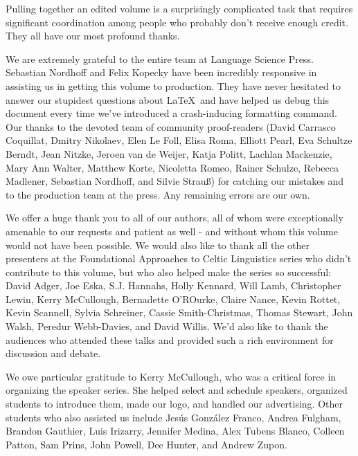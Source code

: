 \addchap{\lsAcknowledgementTitle} 

Pulling together an edited volume is a surprisingly complicated task that requires significant coordination among people who probably don't receive enough credit. They all have our most profound thanks.

We are extremely grateful to the entire team at Language Science Press. Sebastian Nordhoff and Felix Kopecky have been incredibly responsive in assisting us in getting this volume to production. They have never hesitated to answer our stupidest questions about \LaTeX\ and have helped us debug this document every time we've introduced a crash-inducing formatting command. Our thanks to the devoted team of community proof-readers (David Carrasco Coquillat, Dmitry Nikolaev, Elen Le Foll, Elisa Roma, Elliott Pearl, Eva Schultze Berndt, Jean Nitzke, Jeroen van de Weijer, Katja Politt, Lachlan Mackenzie, Mary Ann Walter, Matthew Korte, Nicoletta Romeo, Rainer Schulze, Rebecca Madlener, Sebastian Nordhoff, and Silvie Strauß) for catching our mistakes and to the production team at the press. Any remaining errors are our own. 


We offer a huge thank you to all of our authors, all of whom were exceptionally amenable to our requests and patient as well - and without whom this volume would not have been possible. We would also like to thank all the other presenters at the Foundational Approaches to Celtic Linguistics series who didn't contribute to this volume, but who also helped make the series so successful: David Adger, Joe Eska, S.J. Hannahs, Holly Kennard, Will Lamb, Christopher Lewin, Kerry McCullough, Bernadette O'ROurke, Claire Nance, Kevin Rottet, Kevin Scannell, Sylvia Schreiner, Cassie Smith-Christmas, Thomas Stewart, John Walsh, Peredur Webb-Davies, and David Willis. We'd also like to thank the audiences who attended these talks and provided such a rich environment for discussion and debate.

We owe particular gratitude to Kerry McCullough, who was a critical force in organizing the speaker series. She helped select and schedule speakers, organized students to introduce them, made our logo, and handled our advertising. Other students who also assisted us include Jes\'us Gonz\'alez Franco, Andrea Fulgham, Brandon Gauthier, Luis Irizarry, Jennifer Medina, Alex Tubens Blanco, Colleen Patton, Sam Prins, John Powell, Dee Hunter, and Andrew Zupon.

